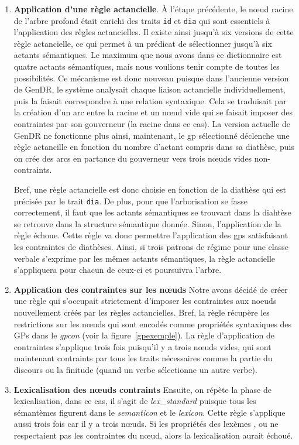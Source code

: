\begin{enumerate}
	\item \textbf{Application d'une règle actancielle}.
	À l'étape précédente, le n\oe{}ud racine de l'arbre profond était enrichi des traits \texttt{id} et \texttt{dia} qui sont essentiels à l'application des règles actancielles. Il existe ainsi jusqu'à six versions de cette règle actancielle, ce qui permet à un prédicat de sélectionner jusqu'à six actants sémantiques. Le maximum que nous avons dans ce dictionnaire est quatre actants sémantiques, mais nous voulions tenir compte de toutes les possibilités. Ce mécanisme est donc nouveau puisque dans l'ancienne version de GenDR, le système analysait chaque liaison actancielle individuellement, puis la faisait correspondre à une relation syntaxique. Cela se traduisait par la création d'un arc entre la racine et un n\oe{}ud vide qui se faisait imposer des contraintes par son gouverneur (la racine dans ce cas). La version actuelle de GenDR ne fonctionne plus ainsi, maintenant, le gp sélectionné déclenche une règle actancille en fonction du nombre d'actant compris dans sa diathèse, puis on crée des arcs en partance du gouverneur vers trois n\oe{}uds vides non-contraints.
	
	Bref, une règle actancielle est donc choisie en fonction de la diathèse qui est précisée par le trait \texttt{dia}. De plus, pour que l'arborisation se fasse correctement, il faut que les actants sémantiques se trouvant dans la diahtèse se retrouve dans la structure sémantique donnée. Sinon, l'application de la règle échoue. Cette règle va donc permettre l'application des gps satisfaisant les contraintes de diathèses. Ainsi, si trois patrons de régime pour une classe verbale s'exprime par les mêmes actants sémantiques, la règle actancielle s'appliquera pour chacun de ceux-ci et poursuivra l'arbre.
	
	\item \textbf{Application des contraintes sur les n\oe{}uds}
Notre avons décidé de créer une règle qui s'occupait strictement d'imposer les contraintes aux noeuds nouvellement créés par les règles actancielles. Bref, la règle récupère les restrictions sur les n\oe{}uds qui sont encodés comme propriétés syntaxiques des \acp{GP} dans le \emph{gpcon} (voir la figure~\ref{gpexemple}). La règle d'application de contraintes s'applique trois fois puisqu'il y a trois n\oe{}uds vides, qui sont maintenant contraints par tous les traits nécessaires comme la partie du discours ou la finitude (quand un verbe sélectionne un autre verbe).

	\item \textbf{Lexicalisation des n\oe{}uds contraints}
Ensuite, on répète la phase de lexicalisation, dans ce cas, il s'agit de \emph{lex\_standard} puisque tous les sémantèmes figurent dans le \emph{semanticon} et le \emph{lexicon}. Cette règle s'applique aussi trois fois car il y a trois n\oe{}uds. Si les propriétés des lexèmes ,  ou  ne respectaient pas les contraintes du n\oe{}ud, alors la lexicalisation aurait échoué.


\end{enumerate}
